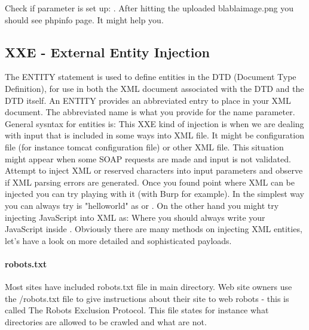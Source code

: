 Check if parameter is set up: .
After hitting the uploaded blablaimage.png you should see phpinfo page.
It might help you.

\subsection{XXE - External Entity Injection}
The ENTITY statement is used to define entities in the DTD (Document Type Definition), for use in both the XML document associated with the DTD and the DTD itself.
An ENTITY provides an abbreviated entry to place in your XML document.
The abbreviated name is what you provide for the name parameter.
General sysntax for entities is: \newline
{} \newline
This XXE kind of injection is when we are dealing with input that is included in some ways into XML file.
It might be configuration file (for instance tomcat configuration file) or other XML file.
This situation might appear when some SOAP requests are made and input is not validated.
Attempt to inject XML or reserved characters into input parameters and observe if XML parsing errors are generated.
Once you found point where XML can be injected you can try playing with it (with Burp for example).
In the simplest way you can always try is "helloworld" as  or .
On the other hand you might try injecting JavaScript into XML as: 
Where you should always write your JavaScript inside .
Obviously there are many methods on injecting XML entities, let's have a look on more detailed and sophisticated payloads.\newline
\paragraph{robots.txt}
Most sites have included robots.txt file in main directory.
Web site owners use the /robots.txt file to give instructions about their site to web robots - this is called The Robots Exclusion Protocol.
This file states for instance what directories are allowed to be crawled and what are not.

